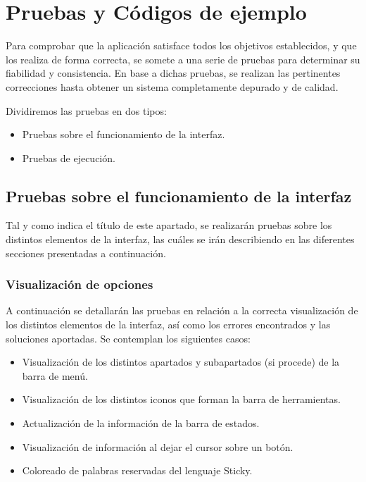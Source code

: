 \documentclass[a4paper, 12pt]{book}
\begin{document}
\chapter{Pruebas y Códigos de ejemplo}
Para comprobar que la aplicación satisface todos los objetivos establecidos, y que los realiza de forma correcta, se somete a una serie de 
pruebas para determinar su fiabilidad y consistencia. En base a dichas pruebas, se realizan las pertinentes correcciones hasta obtener un sistema
completamente depurado y de calidad.

Dividiremos las pruebas en dos tipos:

\begin{itemize}
 \item Pruebas sobre el funcionamiento de la interfaz.
 \item Pruebas de ejecución.
\end{itemize}


\section{Pruebas sobre el funcionamiento de la interfaz}
Tal y como indica el título de este apartado, se realizarán pruebas sobre los distintos elementos de la interfaz, las cuáles se irán describiendo
en las diferentes secciones presentadas a continuación.

\subsection{Visualización de opciones}
A continuación se detallarán las pruebas en relación a la correcta visualización de los distintos elementos de la interfaz, así como los errores 
encontrados y las soluciones aportadas. Se contemplan los siguientes casos:

\begin{itemize}
  \item Visualización de los distintos apartados y subapartados (si procede) de la barra de menú.
  \item Visualización de los distintos iconos que forman la barra de herramientas.
  \item Actualización de la información de la barra de estados.
  \item Visualización de información al dejar el cursor sobre un botón.
  \item Coloreado de palabras reservadas del lenguaje Sticky.
\end{itemize}
\end{document}
